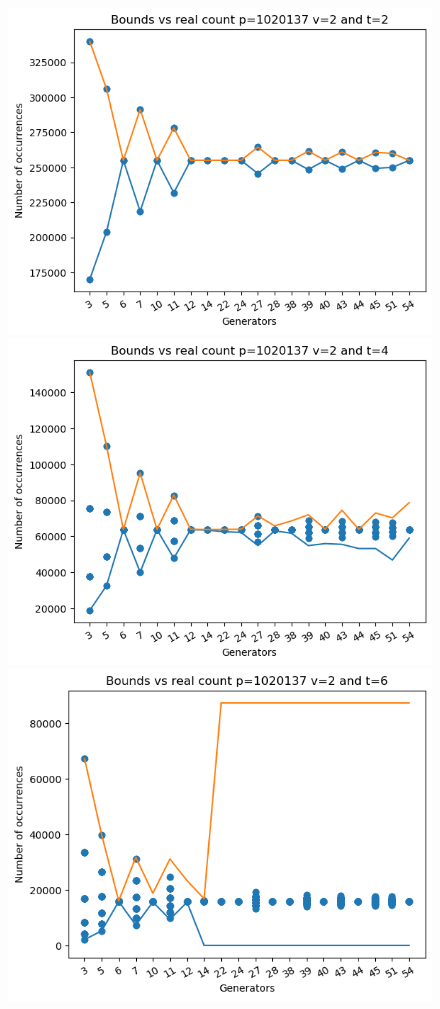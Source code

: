 \documentclass{article}
\begin{document}
\begin{figure}[H]
    \begin{minipage}{.49\textwidth}
            \centering
            \includegraphics[width=\textwidth]{../plots/tuples_figures/1020137v2/test_p1020137_v2_t2.png}
            \includegraphics[width=\textwidth]{../plots/tuples_figures/1020137v2/test_p1020137_v2_t4.png}
            \includegraphics[width=\textwidth]{../plots/tuples_figures/1020137v2/test_p1020137_v2_t6.png}

\end{minipage}
\end{figure}
\end{document}
